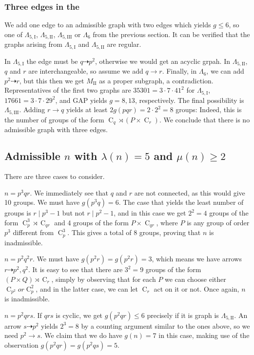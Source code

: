 \documentclass[draft]{article}
\newcommand{\cyc}[1]{\operatorname{C}_{#1}}
\newcommand{\qlame}{\Lambda_{5,\text{I}}}
\newcommand{\qlamz}{\Lambda_{5,\text{II}}}
\newcommand{\qlamd}{\Lambda_{5,\text{III}}}
\theoremstyle{plain}
\theoremstyle{definition}
\begin{document}
\subsubsection*{Three edges in the \hg[1]}
We add one edge to an admissible graph with two edges which yields $g \le 6$, so one of $\qlame$, $\qlamz$, $\qlamd$ or $\Lambda_{6}$ from the previous section. It can be verified that the graphs arising from $\qlame$ and $\qlamz$ are regular.

In $\qlame$ the edge must be $q \dashrightarrow p^2$, otherwise we would get an acyclic grpah. In $\qlamz$, $q$ and $r$ are interchangeable, so assume we add $q \rightarrow r$. Finally, in $\Lambda_6$, we can add $p^2 \dashrightarrow r$, but this then we get $M_\text{II}$ as a proper subgraph, a contradiction. Representatives of the first two graphs are $35301 = 3\cdot7\cdot41^2$ for $\qlame$, $17661 = 3\cdot7\cdot29^2$, and GAP yields $g = 8, 13$, respectively. The final possibility is $\qlamd$. 
Adding $r \rightarrow q$ yields at least $2g(pqr) = 2 \cdot 2^2 = 8$ groups: Indeed, this is the number of groups of the form $\cyc{q} \rtimes (P \times \cyc{r})$. We conclude that there is no admissible graph with three edges.


\subsection{Admissible $n$ with $\lambda(n) = 5$ and $\mu(n) \ge 2$} 
There are three cases to consider.

 $n = p^3 q r$. We immediately see that $q$ and $r$ are not connected, as this would give 10 groups. We must have $g(p^3 q) = 6$. The case that yields the least number of groups is $r \mid p^3 - 1$ but not $r \mid p^2 - 1$, and in this case we get $2^2 = 4$ groups of the form $\cyc{p}^3 \rtimes \cyc{qr}$ and 4 groups of the form $P \times \cyc{qr}$, where $P$ is any group of order $p^3$ different from $\cyc{p}^3$. This gives a total of 8 groups, proving that $n$ is inadmissible.

 $n = p^2 q^2 r$. We must have $g(p^2 r) = g(p^2 r) = 3$, which means we have arrows $r \dashrightarrow p^2, q^2$. It is easy to see that there are $3^2 = 9$ groups of the form $(P \times Q) \rtimes \cyc{r}$, simply by observing that for each $P$ we can choose either $\cyc{p^2} or \cyc{p}^2$, and in the latter case, we can let $\cyc{r}$ act on it or not. Once again, $n$ is inadmissible.
 
 $n = p^2 q r s$.
If $qrs$ is cyclic, we get $g(p^2 q r) \le 6$ precisely if it is graph is $\qlamz$. An arrow $s \dashrightarrow p^2$ yields $2^3 = 8$ by a counting argument similar to the ones above, so we need $p^2 \rightarrow s$. We claim that we do have $g(n) = 7$ in this case, making use of the observation $g(p^2 q r) = g(p^2 q s) = 5$.
\end{document}
